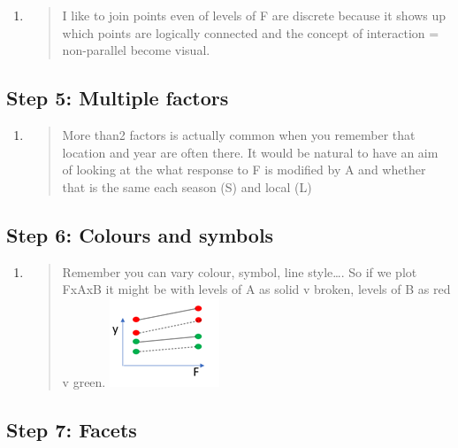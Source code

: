 \documentclass[
]{book}
\begin{document}
\begin{enumerate}
\def\labelenumi{\alph{enumi}.}
\item
  \begin{quote}
  I like to join points even of levels of F are discrete because it shows up which points are logically connected and the concept of interaction = non-parallel become visual.
  \end{quote}
\end{enumerate}

\hypertarget{step-5-multiple-factors}{%
\subsection{Step 5: Multiple factors}\label{step-5-multiple-factors}}

\begin{enumerate}
\def\labelenumi{\alph{enumi}.}
\item
  \begin{quote}
  More than2 factors is actually common when you remember that location and year are often there. It would be natural to have an aim of looking at the what response to F is modified by A and whether that is the same each season (S) and local (L)
  \end{quote}
\end{enumerate}

\hypertarget{step-6-colours-and-symbols}{%
\subsection{Step 6: Colours and symbols}\label{step-6-colours-and-symbols}}

\begin{enumerate}
\def\labelenumi{\alph{enumi}.}
\item
  \begin{quote}
  Remember you can vary colour, symbol, line style\ldots. So if we plot FxAxB it might be with levels of A as solid v broken, levels of B as red v green.
  \includegraphics{img/Picture7.png}
  \end{quote}
\end{enumerate}

\hypertarget{step-7-facets}{%
\subsection{Step 7: Facets}\label{step-7-facets}}
\end{document}
